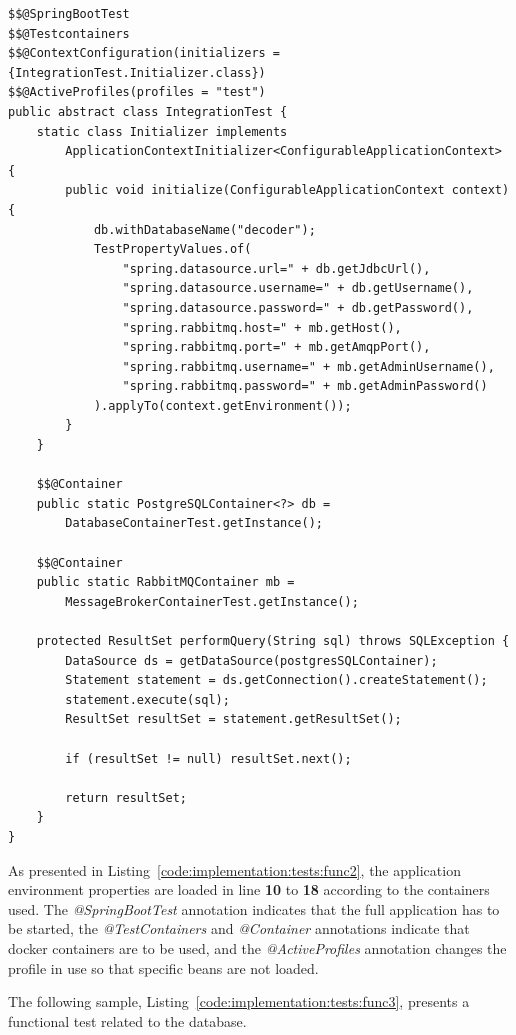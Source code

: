 \begin{lstlisting}[style=Java, caption=Functional Test - Foundation - Data Decoder Backend Setup, label={code:implementation:tests:func2}]
$$@SpringBootTest
$$@Testcontainers
$$@ContextConfiguration(initializers = {IntegrationTest.Initializer.class})
$$@ActiveProfiles(profiles = "test")
public abstract class IntegrationTest {
    static class Initializer implements
        ApplicationContextInitializer<ConfigurableApplicationContext> {
        public void initialize(ConfigurableApplicationContext context) {
            db.withDatabaseName("decoder");
            TestPropertyValues.of(
                "spring.datasource.url=" + db.getJdbcUrl(),
                "spring.datasource.username=" + db.getUsername(),
                "spring.datasource.password=" + db.getPassword(),
                "spring.rabbitmq.host=" + mb.getHost(),
                "spring.rabbitmq.port=" + mb.getAmqpPort(),
                "spring.rabbitmq.username=" + mb.getAdminUsername(),
                "spring.rabbitmq.password=" + mb.getAdminPassword()
            ).applyTo(context.getEnvironment());
        }
    }

    $$@Container
    public static PostgreSQLContainer<?> db =
        DatabaseContainerTest.getInstance();

    $$@Container
    public static RabbitMQContainer mb =
        MessageBrokerContainerTest.getInstance();

    protected ResultSet performQuery(String sql) throws SQLException {
        DataSource ds = getDataSource(postgresSQLContainer);
        Statement statement = ds.getConnection().createStatement();
        statement.execute(sql);
        ResultSet resultSet = statement.getResultSet();

        if (resultSet != null) resultSet.next();

        return resultSet;
    }
}
\end{lstlisting}

As presented in Listing~\ref{code:implementation:tests:func2}, the application environment properties are loaded in line \textbf{10} to \textbf{18} according to the containers used. The \textit{@SpringBootTest} annotation indicates that the full application has to be started, the \textit{@TestContainers} and \textit{@Container} annotations indicate that docker containers are to be used, and the \textit{@ActiveProfiles} annotation changes the profile in use so that specific beans are not loaded.

The following sample, Listing~\ref{code:implementation:tests:func3}, presents a functional test related to the database.

